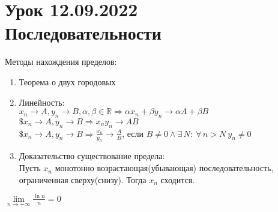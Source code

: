 \documentclass[12pt]{article}
\begin{document}
\section{Урок 12.09.2022\\Последовательности}
Методы нахождения пределов:
\begin{enumerate}
    \item Теорема о двух городовых
    \item Линейность: \\$x_n\rightarrow A, y_n\rightarrow B, \alpha, \beta \in \mathbb{R} \Rightarrow \alpha x_n+\beta y_n \rightarrow \alpha A+\beta B$\\
    $\$x_n\rightarrow A, y_n\rightarrow B \Rightarrow x_ny_n\rightarrow AB$\\
    $\$x_n\rightarrow A, y_n\rightarrow B \Rightarrow \frac{x_n}{y_n}\rightarrow \frac{A}{B}$, если $B \neq 0 \land \exists\,N:\ \forall\,n>N\ y_n \neq 0$
    \item Доказательство существование предела: \\
    Пусть $x_n$ монотонно возрастающая(убывающая) последовательность, ограниченная сверху(снизу). Тогда $x_n$  сходится.
\end{enumerate}
$\lim\limits_{n\rightarrow +\infty}{\frac{\ln{n}}{n}} = 0$
\end{document}
